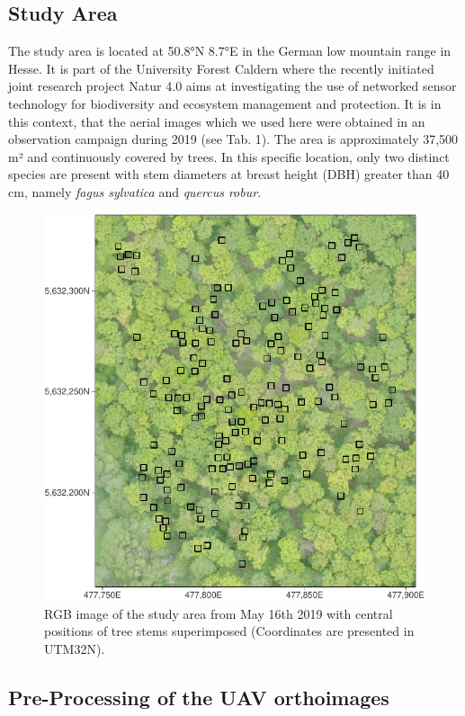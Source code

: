\documentclass[]{article}
\begin{document}
\hypertarget{study-area}{%
\subsection{Study Area}\label{study-area}}

The study area is located at 50.8°N 8.7°E in the German low mountain
range in Hesse. It is part of the University Forest Caldern where the
recently initiated joint research project Natur 4.0 aims at
investigating the use of networked sensor technology for biodiversity
and ecosystem management and protection. It is in this context, that the
aerial images which we used here were obtained in an observation
campaign during 2019 (see Tab. 1). The area is approximately 37,500 m²
and continuously covered by trees. In this specific location, only two
distinct species are present with stem diameters at breast height (DBH)
greater than 40 cm, namely \emph{fagus sylvatica} and \emph{quercus
robur}.

\begin{figure}[H]

{\centering \includegraphics[width=0.6\linewidth]{report_files/figure-latex/plot_aoi-1} 

}

\caption{RGB image of the study area from May 16th 2019 with central positions of tree stems superimposed (Coordinates are presented in UTM32N).}\label{fig:plot_aoi}
\end{figure}

\hypertarget{pre-processing-of-the-uav-orthoimages}{%
\subsection{Pre-Processing of the UAV
orthoimages}\label{pre-processing-of-the-uav-orthoimages}}
\end{document}
